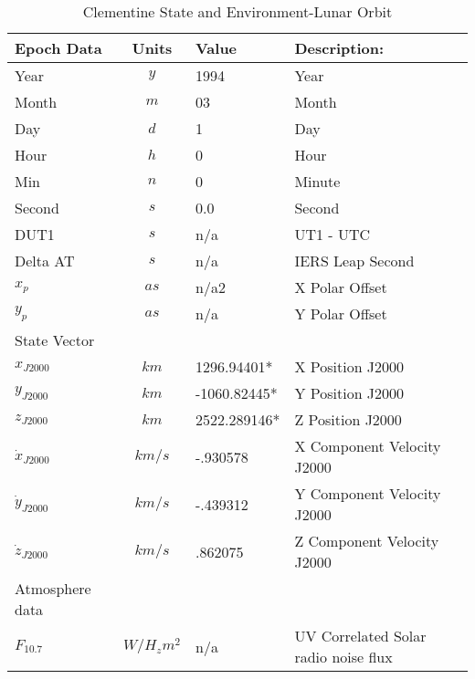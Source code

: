 \begin{table}[htb]
\begin{center}
\caption{Clementine State and Environment-Lunar Orbit} \vspace{5mm}
\begin{tabular}{|l|c|l|l|}
\hline
Epoch Data    & Units     & Value   & Description:     \\ \hline \hline
Year          & $y$       & 1994        &     Year             \\ \hline
Month         & $m$       &  03       &     Month              \\ \hline
Day           & $d$       &  1           &     Day              \\ \hline
Hour          & $h$       & 0           &     Hour               \\ \hline
Min           & $n$       & 0            &     Minute               \\ \hline
Second        & $s$       & 0.0         &     Second               \\ \hline
DUT1          & $s$       &  n/a   & UT1 - UTC        \\ \hline
Delta AT      & $s$       &  n/a       & IERS Leap Second \\ \hline \hline
$x_p$         & $as$      &  n/a2   &  X Polar Offset   \\ \hline
$y_p$         & $as$      &  n/a  &  Y Polar Offset    \\ \hline \hline
State Vector      &           &     &      \\ \hline \hline
$x_{J2000}$       & $km$      &1296.94401*    &  X Position J2000       \\ \hline
$y_{J2000}$       & $km$      & -1060.82445*   &  Y Position J2000        \\ \hline
$z_{J2000}$       & $km$      & 2522.289146*   &  Z Position J2000       \\ \hline
$\dot x_{J2000}$  &$km/s$       &-.930578    &  X Component Velocity J2000   \\ \hline
$\dot y_{J2000}$  &$km/s$       &-.439312   &  Y Component Velocity J2000    \\ \hline
$\dot z_{J2000}$  &$km/s$       & .862075  &  Z Component Velocity J2000      \\ \hline \hline
Atmosphere data   &                   &          &      \\ \hline \hline
$F_{10.7}$        & $W/{H_z}{m^2}$    & n/a    & UV Correlated Solar radio noise flux             \\ \hline

\end{tabular}
\end{center}
\end{table}
